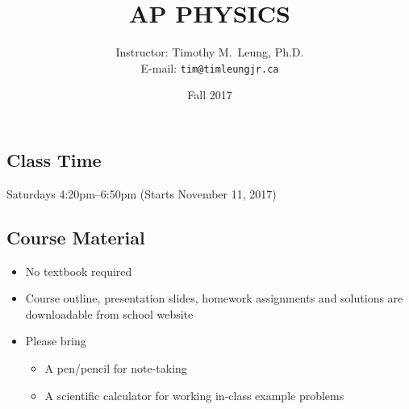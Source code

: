 \documentclass[11pt]{article}
\title{\vspace{-0.2in}\textbf{AP PHYSICS}}
\author{Instructor: Timothy M.\ Leung, Ph.D.\\
  E-mail: \texttt{tim@timleungjr.ca}}
\date{Fall 2017}
\begin{document}
\maketitle

\subsection*{Class Time}
Saturdays 4:20pm--6:50pm (Starts November 11, 2017)


%
\subsection*{Course Material}
\begin{itemize}[itemsep=.1em] %
\item No textbook required
\item Course outline, presentation slides, homework assignments and solutions
  are downloadable from school website
\item Please bring
  \begin{itemize}[noitemsep,topsep=0pt]
  \item A pen/pencil for note-taking
  \item A scientific calculator for working in-class example problems
  \end{itemize}
\end{itemize}
\end{document}
